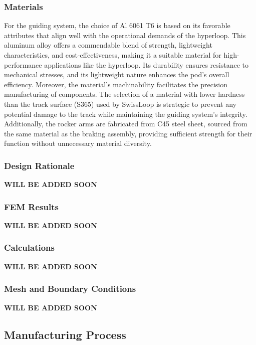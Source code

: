 \subsubsection{Materials}

For the guiding system, the choice of Al 6061 T6 is based on its favorable attributes that align well with the operational demands of the hyperloop. This aluminum alloy offers a commendable blend of strength, lightweight characteristics, and cost-effectiveness, making it a suitable material for high-performance applications like the hyperloop. Its durability ensures resistance to mechanical stresses, and its lightweight nature enhances the pod's overall efficiency. Moreover, the material's machinability facilitates the precision manufacturing of components. The selection of a material with lower hardness than the track surface (S365) used by SwissLoop is strategic to prevent any potential damage to the track while maintaining the guiding system's integrity. Additionally, the rocker arms are fabricated from C45 steel sheet, sourced from the same material as the braking assembly, providing sufficient strength for their function without unnecessary material diversity.

\subsubsection{Design Rationale}
\textbf{WILL BE ADDED SOON}

\subsubsection{FEM Results}
\textbf{WILL BE ADDED SOON}
\subsubsection{Calculations}
\textbf{WILL BE ADDED SOON}
\subsubsection{Mesh and Boundary Conditions}
\textbf{WILL BE ADDED SOON}


\subsection{Manufacturing Process}

